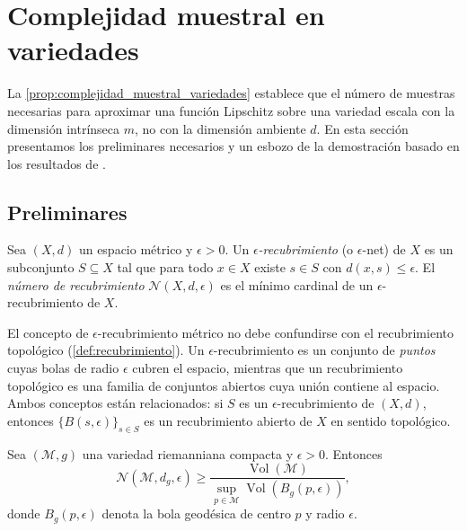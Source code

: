 \section{Complejidad muestral en variedades}\label{sec:complejidad_muestral}

La \autoref{prop:complejidad_muestral_variedades} establece que el número de muestras necesarias para aproximar una función Lipschitz sobre una variedad escala con la dimensión intrínseca $m$, no con la dimensión ambiente $d$. En esta sección presentamos los preliminares necesarios y un esbozo de la demostración basado en los resultados de \citet{niyogi2008finding}.

\subsection{Preliminares}\label{subsec:complejidad_muestral_preliminares}

\begin{definition}\label{def:numero_recubrimiento}
Sea $(X, d)$ un espacio métrico y $\epsilon > 0$. Un \textit{$\epsilon$-recubrimiento} (o $\epsilon$-net) de $X$ es un subconjunto $S \subseteq X$ tal que para todo $x \in X$ existe $s \in S$ con $d(x, s) \leq \epsilon$. El \textit{número de recubrimiento} $\mathcal{N}(X, d, \epsilon)$ es el mínimo cardinal de un $\epsilon$-recubrimiento de $X$.
\end{definition}

\begin{remark}\label{rem:recubrimiento_vs_topologico}
El concepto de $\epsilon$-recubrimiento métrico no debe confundirse con el recubrimiento topológico (\autoref{def:recubrimiento}). Un $\epsilon$-recubrimiento es un conjunto de \textit{puntos} cuyas bolas de radio $\epsilon$ cubren el espacio, mientras que un recubrimiento topológico es una familia de conjuntos abiertos cuya unión contiene al espacio. Ambos conceptos están relacionados: si $S$ es un $\epsilon$-recubrimiento de $(X,d)$, entonces $\{B(s, \epsilon)\}_{s \in S}$ es un recubrimiento abierto de $X$ en sentido topológico.
\end{remark}

\begin{lemma}\label{lem:cota_volumetrica_recubrimiento}
Sea $(\mathcal{M}, g)$ una variedad riemanniana compacta y $\epsilon > 0$. Entonces
\[
\mathcal{N}(\mathcal{M}, d_g, \epsilon) \geq \frac{\operatorname{Vol}(\mathcal{M})}{\sup_{p \in \mathcal{M}} \operatorname{Vol}(B_g(p, \epsilon))},
\]
donde $B_g(p, \epsilon)$ denota la bola geodésica de centro $p$ y radio $\epsilon$.
\end{lemma}

